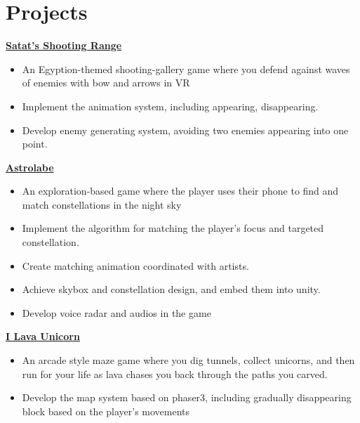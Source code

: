 \documentclass{article}
\begin{document}
{		\section{Projects}
		\vspace{5pt}
		
		\textbf{\href{http://www.plutoshe.com/blog/Satat'sShootingRange}{Satat's Shooting Range}} \hfill \quad
		
		\begin{itemize}
			\item An Egyption-themed shooting-gallery game where you defend against waves of enemies with bow and arrows in VR
			\item Implement the animation system, including appearing, disappearing.
			\item Develop enemy generating system, avoiding two enemies appearing into one point.
		\end{itemize}
		
		
		\textbf{\href{http://www.plutoshe.com/blog/Astrolabe}{Astrolabe}} \hfill \quad
		
		\begin{itemize}
			\item An exploration-based game where the player uses their phone to find and match constellations in the night sky
			\item Implement the algorithm for matching the player's focus and targeted constellation.
			
			\item Create matching animation coordinated with artists.
			
			\item Achieve skybox and constellation design, and embed them into unity.
			
			\item Develop voice radar and audios in the game
			

		\end{itemize}
		
		
		
		\textbf{\href{http://www.plutoshe.com/blog/ILavaUnicorn}{I Lava Unicorn}} \hfill \quad
		
		\begin{itemize}
			\item An arcade style maze game where you dig tunnels, collect unicorns, and then run for your life as lava chases you back through the paths you carved.
			\item Develop the map system based on phaser3, including gradually disappearing block based on the player's movements
			

\end{itemize}}
\end{document}
